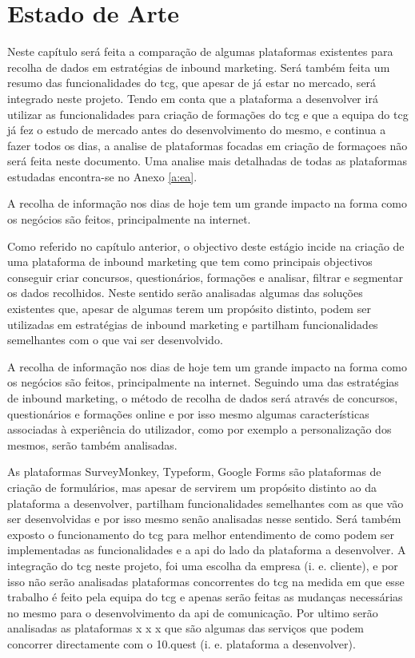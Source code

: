 \chapter{Estado de Arte}
\label{sec:estado-arte}

Neste capítulo será feita a comparação de algumas plataformas existentes para recolha de dados em estratégias de inbound marketing. Será também feita um resumo das funcionalidades do \acrshort{tcg}, que apesar de já estar no mercado, será integrado neste projeto. Tendo em conta que a plataforma a desenvolver irá utilizar as funcionalidades para criação de formações do \acrshort{tcg} e que a equipa do \acrlong{tcg} já fez o estudo de mercado antes do desenvolvimento do mesmo, e continua a fazer todos os dias, a analise de plataformas focadas em criação de formaçoes não será feita neste documento. Uma analise mais detalhadas de todas as plataformas estudadas encontra-se no Anexo \ref{a:ea}.

A recolha de informação nos dias de hoje tem um grande impacto na forma como os negócios são feitos, principalmente na internet.

Como referido no capítulo anterior, o objectivo deste estágio incide na criação de uma plataforma de inbound marketing que tem como principais objectivos conseguir criar concursos, questionários, formações e analisar, filtrar e segmentar os dados recolhidos. Neste sentido serão analisadas algumas das soluções existentes que, apesar de algumas terem um propósito distinto, podem ser utilizadas em estratégias de inbound marketing e partilham funcionalidades semelhantes com o que vai ser desenvolvido. 

A recolha de informação nos dias de hoje tem um grande impacto na forma como os negócios são feitos, principalmente na internet. Seguindo uma das estratégias de inbound marketing, o método de recolha de dados será através de concursos, questionários e formações online e por isso mesmo algumas características associadas à experiência do utilizador, como por exemplo a personalização dos mesmos, serão também analisadas.


As plataformas SurveyMonkey\cite{surveymonkey}, Typeform\cite{typeform}, Google Forms\cite{googleform} são plataformas de criação de formulários, mas apesar de servirem um propósito distinto ao da plataforma a desenvolver, partilham funcionalidades semelhantes com as que vão ser desenvolvidas e por isso mesmo senão analisadas nesse sentido. Será também exposto o funcionamento do \acrshort{tcg} para melhor entendimento de como podem ser implementadas as funcionalidades e a \acrshort{api} do lado da plataforma a desenvolver. A integração do \acrshort{tcg} neste projeto, foi uma escolha da empresa (i. e. cliente), e por isso não serão analisadas plataformas concorrentes do \acrshort{tcg} na medida em que esse trabalho é feito pela equipa do \acrshort{tcg} e apenas serão feitas as mudanças necessárias no mesmo para o desenvolvimento da \acrshort{api} de comunicação. Por ultimo serão analisadas as plataformas x x x que são algumas das serviços que podem concorrer directamente com o 10.quest (i. e. plataforma a desenvolver).

